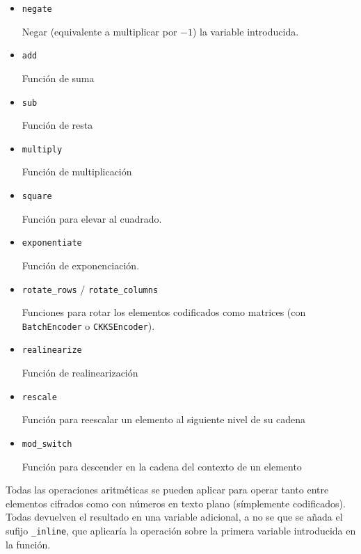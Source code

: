 \begin{itemize}
    \item \verb|negate|
    
    Negar (equivalente a multiplicar por $-1$) la variable introducida.
    
    \item \verb|add|
    
    Función de suma
    
    \item \verb|sub|
    
    Función de resta
    
    \item \verb|multiply|
    
    Función de multiplicación
    
    \item \verb|square|
    
    Función para elevar al cuadrado.
    
    \item \verb|exponentiate|
    
    Función de exponenciación.
    
    \item \verb|rotate_rows| /  \verb|rotate_columns|
    
    Funciones para rotar los elementos codificados como matrices (con \verb|BatchEncoder| o \verb|CKKSEncoder|).
    
    \item \verb|realinearize|
    
    Función de realinearización
    
    \item \verb|rescale|
    
    Función para reescalar un elemento al siguiente nivel de su cadena
    
    \item \verb|mod_switch|
    
    Función para descender en la cadena del contexto de un elemento
    
\end{itemize}

Todas las operaciones aritméticas se pueden aplicar para operar tanto entre elementos cifrados como con números en texto plano (símplemente codificados). Todas devuelven el resultado en una variable adicional, a no se que se añada el sufijo \verb|_inline|, que aplicaría la operación sobre la primera variable introducida en la función.

